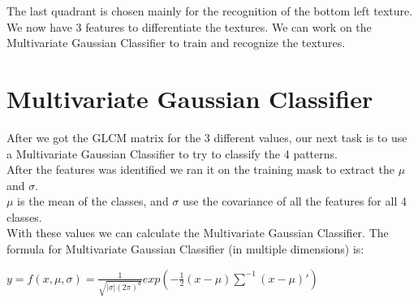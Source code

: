 \documentclass{article}
\begin{document}
The last quadrant is chosen mainly for the recognition of the bottom left texture.\\
\vspace{10px}
We now have 3 features to differentiate the textures. We can work on the Multivariate Gaussian Classifier to train and recognize the textures. 


\section{Multivariate Gaussian Classifier}	
		After we got the GLCM matrix for the 3 different values, our next task is to use a Multivariate Gaussian Classifier to try to classify the 4 patterns.\\
	After the features was identified we ran it on the training mask to extract the $\mu$ and $\sigma$.\\
	$\mu$ is the mean of the classes, and $\sigma$ use the covariance of all the features for all 4 classes.\\
	With these values we can calculate the Multivariate Gaussian Classifier.
	The formula for Multivariate Gaussian Classifier (in multiple dimensions) is:
	\begin{center}
		$y = f( x , \mu , \sigma)=\frac{1}{\sqrt{|\sigma|(2\pi)^{d}}}exp\left(-\frac{1}{2}(x-\mu)\sum^{-1}(x-\mu)'\right)$
	\end{center}
	
\newpage
\end{document}
